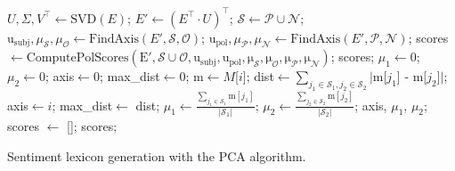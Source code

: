 \begin{algorithm}
  \begin{algorithmic}
    \Statex{}
    \Statex{}
    \State $U, \Sigma, V^\top\gets\textrm{SVD}(E)$;
    \State $E'\gets\left(E^\top\cdot U\right)^\top$;
    \State $\mathcal{S}\gets\mathcal{P}\cup\mathcal{N}$;
    \State $\textrm{u}_{\textrm{subj}}, \mu_{\mathcal{S}}, \mu_{\mathcal{O}}\gets\textrm{FindAxis}(E', \mathcal{S}, \mathcal{O})$;
    \State $\textrm{u}_{\textrm{pol}}, \mu_{\mathcal{P}}, \mu_{\mathcal{N}}\gets\textrm{FindAxis}(E', \mathcal{P}, \mathcal{N})$;
    \State scores$\gets\mathrm{ComputePolScores(E', \mathcal{S}\cup\mathcal{O},
      u_{\textrm{subj}}, u_{\textrm{pol}}, \mu_{\mathcal{S}}, \mu_{\mathcal{O}},
      \mu_{\mathcal{P}}, \mu_{\mathcal{N}})}$;
    \State\Return scores;
    \EndFunction
    \Statex
    \State $\mu_1\gets 0$; $\mu_2\gets 0$;
    \State axis$\gets 0$; max\_dist$\gets 0$;
    \State m$\gets M$[$i$];
    \State dist$\gets\sum_{j_1\in\mathcal{S}_1,j_2\in\mathcal{S}_2}|$m[$j_1$] - m[$j_2$]$|$;
    \State axis$\gets i$;
    \State max\_dist$\gets$ dist;
    \State $\mu_1\gets\frac{\sum_{j_1\in\mathcal{S}_1}\textrm{m}[j_1]}{|\mathcal{S}_1|}$;
    \State $\mu_2\gets\frac{\sum_{j_2\in\mathcal{S}_2}\textrm{m}[j_2]}{|\mathcal{S}_2|}$;
    \EndIf
    \EndFor
    \State\Return axis, $\mu_1$, $\mu_2$;
    \EndFunction
    \Statex
    \State scores $\gets$ [];
    \State\Return scores;
    \EndFunction
  \end{algorithmic}
  \caption[Sentiment lexicon generation using PCA.]{Sentiment lexicon
    generation with the PCA algorithm.}\label{snt:lex:alg:pca}
\end{algorithm}


